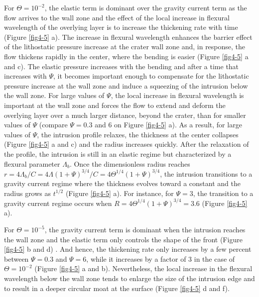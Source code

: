 \begin{article}
        For $\Theta=10^{-2}$,  the elastic  term is dominant  over the
        gravity current term as the flow  arrives to the wall zone and
        the effect of the local increase in flexural wavelength of the
        overlying layer is  to increase the thickening  rate with time
        (Figure \ref{fig4-5}  a). The increase in  flexural wavelength
        enhances  the  barrier  effect  of  the  lithostatic  pressure
        increase at  the crater wall  zone and, in response,  the flow
        thickens rapidly  in the center,  where the bending  is easier
        (Figure \ref{fig4-5} a and  c). The elastic pressure increases
        with the bending and after  a time that increases with $\Psi$,
        it becomes important enough  to compensate for the lithostatic
        pressure increase at  the wall zone and induce  a squeezing of
        the intrusion below the wall zone. For large values of $\Psi$,
        the local increase in flexural  wavelength is important at the
        wall  zone  and forces  the  flow  to  extend and  deform  the
        overlying  layer  over  a  much larger  distance,  beyond  the
        crater, than for smaller  values of $\Psi$ (compare $\Psi=0.3$
        and  $6$ on  Figure \ref{fig4-5}  a). As  a result,  for large
        values of $\Psi$, the intrusion profile relaxes, the thickness
        at the center collapses (Figure  \ref{fig4-5} a and c) and the
        radius increases quickly. After the relaxation of the profile,
        the intrusion is still in  an elastic regime but characterized
        by a  flexural parameter  $\Lambda_b$. Once  the dimensionless
        radius                                                 reaches
        $r=4\Lambda_{b}/C=
        4\Lambda(1+\Psi)^{3/4}/C=4\Theta^{1/4}(1+\Psi)^{3/4}$,
        the intrusion  transitions to  a gravity current  regime where
        the thickness evolves  toward a constant and  the radius grows
        as  $t^{1/2}$  (Figure  \ref{fig4-5}  a).  For  instance,  for
        $\Psi=3$, the  transition to  a gravity current  regime occurs
        when $R= 4\Theta^{1/4}(1+\Psi)^{3/4}=3.6$ (Figure \ref{fig4-5}
        a).
	 
        For  $\Theta=10^{-5}$, the  gravity current  term is  dominant
        when the intrusion reaches the  wall zone and the elastic term
        only controls  the shape of  the front (Figure  \ref{fig4-5} b
        and d)  . And hence, the  thickening rate only increases  by a
        few  percent   between  $\Psi=0.3$  and  $\Psi=6$,   while  it
        increases by a  factor of $3$ in the  case of $\Theta=10^{-2}$
        (Figure  \ref{fig4-5}  a  and   b).  Nevertheless,  the  local
        increase in the flexural wavelength  below the wall zone tends
        to enlarge the  size of the intrusion edge and  to result in a
        deeper circular moat at the surface (Figure \ref{fig4-5} d and
        f).
		 

\end{article}
